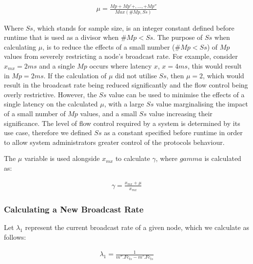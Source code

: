    \begin{equation*}
		     \begin{aligned}
		         \mu = \frac{Mp + Mp'+,\ldots,+ Mp''}{Max(\#Mp, Ss)}
		     \end{aligned}
    \end{equation*} 
    
    Where $Ss$, which stands for sample size, is an integer constant defined before runtime that is used as a divisor when $\#Mp < Ss$.  The purpose of $Ss$ when calculating $\mu$, is to reduce the effects of a small number ($\#Mp < Ss$) of $Mp$ values from severely restricting a node's broadcast rate.  For example, consider  $x_{mx} = 2ms$ and a single $Mp$ occurs where latency $x$, $x = 4ms$, this would result in $Mp = 2ms$.  If the calculation of $\mu$ did not utilise $Ss$, then $\mu = 2$, which would result in the broadcast rate being reduced significantly and the flow control being overly restrictive.  However, the $Ss$ value can be used to minimise the effects of a single latency on the calculated $\mu$, with a large $Ss$ value marginalising the impact of a small number of $Mp$ values, and a small $Ss$ value increasing their significance.  The level of flow control required by a system is determined by its use case, therefore we defined $Ss$ as a constant specified before runtime in order to allow system administrators greater control of the protocols behaviour.  
    
    The $\mu$ variable is used alongside $x_{mx}$ to calculate $\gamma$, where $gamma$ is calculated as:
    
    \begin{equation*}
		     \begin{aligned}
		         \gamma = \frac{x_{mx} + \mu}{x_{mx}}
		     \end{aligned}
    \end{equation*} 
    
    \subsubsection*{Calculating a New Broadcast Rate}
    Let $\lambda_1$ represent the current broadcast rate of a given node, which we calculate as follows:

    \begin{equation*}
		     \begin{aligned}
		         \lambda_1 = \frac{1}{m''.Fc_{ts} - m'.Fc_{ts}}
		     \end{aligned}
    \end{equation*} 
    
